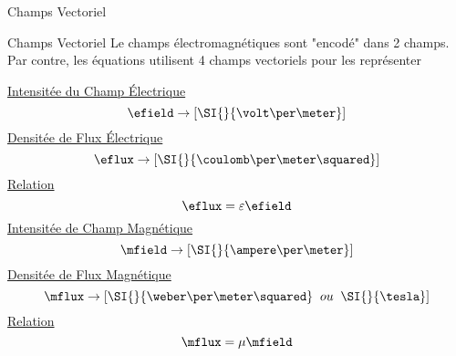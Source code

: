 \begin{frame}{Champs Vectoriel}
    \begin{twocolumns}[0.4]
        \leftcol
        \rightcol
    \end{twocolumns}
\end{frame}

\begin{frame}{Champs Vectoriel}
    \centering
    Le champs électromagnétiques sont "encodé" dans 2 champs. \\
    Par contre, les équations utilisent 4 champs vectoriels pour les représenter\\
    \vspace{15pt}
    \begin{twocolumns}[0.4]
        \leftcol
            \centering
            \underline{Intensitée du Champ Électrique}
            \begin{equation*}
                \efield \rightarrow [\SI{}{\volt\per\meter}]
            \end{equation*}
            \underline{Densitée de Flux Électrique}
            \begin{equation*}
                \eflux \rightarrow [\SI{}{\coulomb\per\meter\squared}]
            \end{equation*}
            \underline{Relation}
            \begin{equation*}
                \eflux = \varepsilon \efield
            \end{equation*}
        \rightcol
            \centering
            \underline{Intensitée de Champ Magnétique}
            \begin{equation*}
                \mfield \rightarrow [\SI{}{\ampere\per\meter}]
            \end{equation*}
            \underline{Densitée de Flux Magnétique}
            \begin{equation*}
                \mflux \rightarrow [\SI{}{\weber\per\meter\squared} \;\; ou \;\; \SI{}{\tesla}]
            \end{equation*}
            \underline{Relation}
            \begin{equation*}
                \mflux = \mu \mfield
            \end{equation*}
    \end{twocolumns}
\end{frame}

